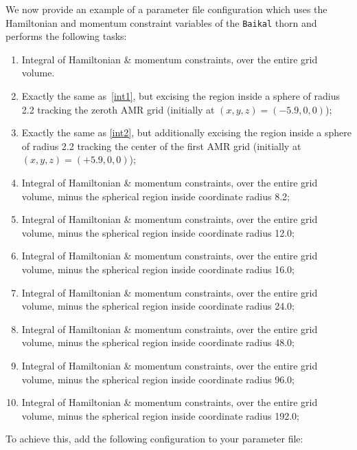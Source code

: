 We now provide an example of a parameter file configuration which uses
the Hamiltonian and momentum constraint variables of the \texttt{Baikal}
thorn and performs the following tasks:
\begin{enumerate}
  \setlength{\itemsep}{0.0pt}
  \setlength{\parskip}{0.0pt}
  \setlength{\parsep}{ 0.0pt}
\item Integral of Hamiltonian \& momentum constraints, over the entire
  grid volume.
  \label{int1}
  \item Exactly the same as~\ref{int1}, but excising the region inside a
  sphere of radius 2.2 tracking the zeroth AMR grid (initially at
  $(x,y,z) = (-5.9,0,0)$);
  \label{int2}
  \item Exactly the same as \ref{int2}, but additionally excising the
  region inside a sphere of radius 2.2 tracking the center of the first
  AMR grid (initially at $(x,y,z)=(+5.9,0,0)$);
  \label{int3}
  \item Integral of Hamiltonian \& momentum constraints, over the entire
  grid volume, minus the spherical region inside coordinate radius 8.2;
  \label{int4}
  \item Integral of Hamiltonian \& momentum constraints, over the entire
  grid volume, minus the spherical region inside coordinate radius 12.0;
  \label{int5}
  \item Integral of Hamiltonian \& momentum constraints, over the entire
  grid volume, minus the spherical region inside coordinate radius 16.0;
  \label{int6}
  \item Integral of Hamiltonian \& momentum constraints, over the entire
  grid volume, minus the spherical region inside coordinate radius 24.0;
  \label{int7}
  \item Integral of Hamiltonian \& momentum constraints, over the entire
  grid volume, minus the spherical region inside coordinate radius 48.0;
  \label{int8}
  \item Integral of Hamiltonian \& momentum constraints, over the entire
  grid volume, minus the spherical region inside coordinate radius 96.0;
  \label{int9}
  \item Integral of Hamiltonian \& momentum constraints, over the entire
  grid volume, minus the spherical region inside coordinate radius 192.0;
  \label{int10}
\end{enumerate}
To achieve this, add the following configuration to your parameter file:
